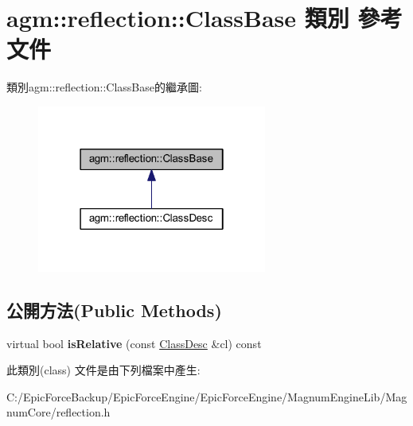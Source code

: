 \hypertarget{classagm_1_1reflection_1_1_class_base}{}\section{agm\+:\+:reflection\+:\+:Class\+Base 類別 參考文件}
\label{classagm_1_1reflection_1_1_class_base}


類別agm\+:\+:reflection\+:\+:Class\+Base的繼承圖\+:\nopagebreak
\begin{figure}[H]
\begin{center}
\leavevmode
\includegraphics[width=214pt]{classagm_1_1reflection_1_1_class_base__inherit__graph}
\end{center}
\end{figure}
\subsection*{公開方法(Public Methods)}
\begin{DoxyCompactItemize}
\item 
virtual bool {\bfseries is\+Relative} (const \hyperlink{classagm_1_1reflection_1_1_class_desc}{Class\+Desc} \&cl) const \hypertarget{classagm_1_1reflection_1_1_class_base_a044ae7d50be9f265af2fe791c57f77c1}{}\label{classagm_1_1reflection_1_1_class_base_a044ae7d50be9f265af2fe791c57f77c1}

\end{DoxyCompactItemize}


此類別(class) 文件是由下列檔案中產生\+:\begin{DoxyCompactItemize}
\item 
C\+:/\+Epic\+Force\+Backup/\+Epic\+Force\+Engine/\+Epic\+Force\+Engine/\+Magnum\+Engine\+Lib/\+Magnum\+Core/reflection.\+h\end{DoxyCompactItemize}
